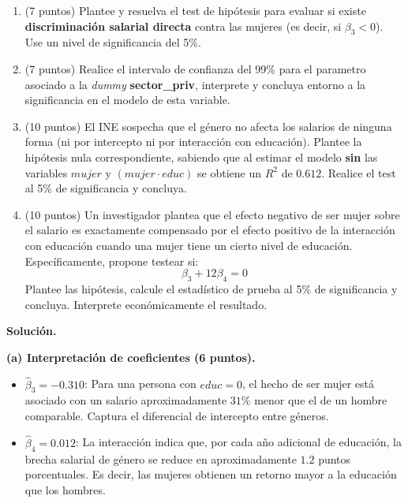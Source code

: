 \documentclass[10pt,a4paper]{article}
\begin{document}
\begin{enumerate}
\begin{enumerate}
    \item[(b)] (7 puntos) Plantee y resuelva el test de hipótesis para evaluar si existe \textbf{discriminación salarial directa} contra las mujeres (es decir, si $\beta_3 < 0$). Use un nivel de significancia del 5\%.

      \item[(c)] (7 puntos) Realice el intervalo de confianza del 99\% para el parametro asociado a la \textit{dummy} \textbf{sector_priv}, interprete y concluya entorno a la significancia en el modelo de esta variable.
    
    \item[(d)] (10 puntos) El INE sospecha que el género no afecta los salarios de ninguna forma (ni por intercepto ni por interacción con educación). Plantee la hipótesis nula correspondiente, sabiendo que al estimar el modelo \textbf{sin} las variables $mujer$ y $(mujer \cdot educ)$ se obtiene un $R^2$ de $0.612$. Realice el test al 5\% de significancia y concluya.
    
    \item[(e)] (10 puntos) Un investigador plantea que el efecto negativo de ser mujer sobre el salario es exactamente compensado por el efecto positivo de la interacción con educación cuando una mujer tiene un cierto nivel de educación. Específicamente, propone testear si:
    \[
    \beta_3 + 12 \beta_4 = 0
    \]
    Plantee las hipótesis, calcule el estadístico de prueba al 5\% de significancia y concluya. Interprete económicamente el resultado.
    
\end{enumerate}

\textbf{Solución.}

\textbf{(a) Interpretación de coeficientes (6 puntos).}

\begin{itemize}
    \item $\hat{\beta}_3 = -0.310$: Para una persona con $educ = 0$, el hecho de ser mujer está asociado con un salario aproximadamente $31\%$ menor que el de un hombre comparable. Captura el diferencial de intercepto entre géneros.
    
    \item $\hat{\beta}_4 = 0.012$: La interacción indica que, por cada año adicional de educación, la brecha salarial de género se reduce en aproximadamente $1.2$ puntos porcentuales. Es decir, las mujeres obtienen un retorno mayor a la educación que los hombres.
\end{itemize}


\end{enumerate}
\end{document}

